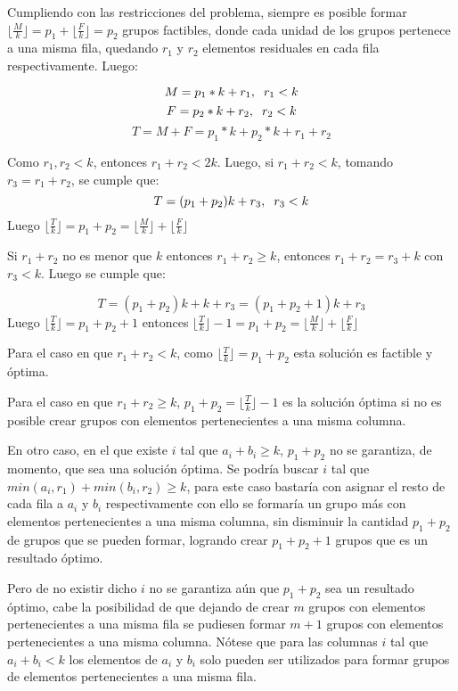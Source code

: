 \documentclass[article]{llncs}
\begin{document}
%

Cumpliendo con las restricciones del problema, siempre es posible formar 
$\lfloor \frac{M}{k}\rfloor=p_1  + \lfloor \frac{F}{k}\rfloor=p_2 $ grupos factibles, 
donde cada unidad de los grupos pertenece a una misma fila, quedando $r_1$ y 
$r_2$ elementos residuales en cada fila respectivamente. Luego:

$$M = p_1 * k + r_1, \hspace{0,2 cm} r_1 < k$$
$$F = p_2 * k + r_2, \hspace{0,2 cm} r_2 < k$$
$$T = M + F = p_1 * k + p_2*k + r_1 + r_2$$

Como $r_1, r_2 < k$, entonces $r_1 + r_2 < 2k$. Luego, si $r_1 + r_2 < k$, tomando 
$r_3 = r_1 + r_2$, se cumple que:
$$T = (p_1 + p_2)k + r_3, \hspace{0,2 cm} r_3 < k$$
Luego $\lfloor \frac{T}{k}\rfloor = p_1 + p_2 = \lfloor \frac{M}{k}\rfloor  + \lfloor \frac{F}{k}\rfloor$

\vspace{0,2 cm}

Si $r_1 + r_2$ no es menor que $k$ entonces $r_1 + r_2 \geq k$, entonces $r_1 + r_2 = r_3 + k$
con $r_3 < k$. Luego se cumple que:

$$T = (p_1 + p_2)k + k + r_3 = (p_1 + p_2 + 1)k + r_3$$
Luego $\lfloor \frac{T}{k}\rfloor = p_1 + p_2 + 1$ entonces $\lfloor \frac{T}{k}\rfloor -1 = p_1 + p_2 = \lfloor \frac{M}{k}\rfloor  + \lfloor \frac{F}{k}\rfloor$

\vspace{0,2 cm}

Para el caso en que $r_1 + r_2 < k$, como $\lfloor \frac{T}{k}\rfloor = p_1 + p_2$ esta solución es factible 
y óptima.

Para el caso en que $r_1 + r_2 \geq k$, $p_1 + p_2 = \lfloor \frac{T}{k}\rfloor -1$ es 
la soluci\'on \'optima si no es posible crear grupos con elementos pertenecientes a una misma columna.

En otro caso, en el que existe $i$ tal que $a_i + b_i \geq k$, $p_1 + p_2$
no se garantiza, de momento, que sea una solución \'optima. Se podr\'ia 
buscar $i$ tal que $min(a_i, r_1) + min(b_i, r_2) \geq k$, para este caso 
bastar\'ia con asignar el resto de cada fila a $a_i$ y $b_i$ respectivamente
con ello se formar\'ia un grupo m\'as con elementos pertenecientes a una misma columna, 
sin disminuir la cantidad $p_1 + p_2$ de grupos que se pueden formar, logrando 
crear $p_1 + p_2 + 1$ grupos que es un resultado \'optimo.

Pero de no existir dicho $i$ no se garantiza a\'un que $p_1 + p_2$ sea 
un resultado \'optimo, cabe la posibilidad de que dejando de crear 
$m$ grupos con elementos pertenecientes a una misma fila se pudiesen 
formar $m+1$ grupos con elementos pertenecientes a una misma columna.
N\'otese que para las columnas $i$ tal que $a_i + b_i < k$ los elementos 
de $a_i$ y $b_i$ solo pueden ser utilizados para formar grupos de elementos
pertenecientes a una misma fila.
\end{document}
